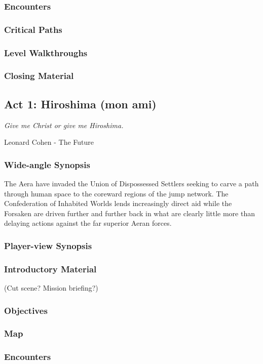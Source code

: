 \subsubsection{Encounters}
\subsubsection{Critical Paths}
\subsubsection{Level Walkthroughs}
\subsubsection{Closing Material}

\subsection{Act 1: Hiroshima (mon ami)}
\begin{center}
{\it Give me Christ or give me Hiroshima.}

Leonard Cohen - The Future
\end{center}
\subsubsection{Wide-angle Synopsis}
The Aera have invaded the Union of Dispossessed Settlers seeking to
carve a path through human space to the coreward regions of the jump
network. The Confederation of Inhabited Worlds lends increasingly
direct aid while the Forsaken are driven further and further back in
what are clearly little more than delaying actions against the far
superior Aeran forces.
\subsubsection{Player-view Synopsis}
\subsubsection{Introductory Material}
 (Cut scene?  Mission briefing?)
\subsubsection{Objectives}
\subsubsection{Map}
\subsubsection{Encounters}
